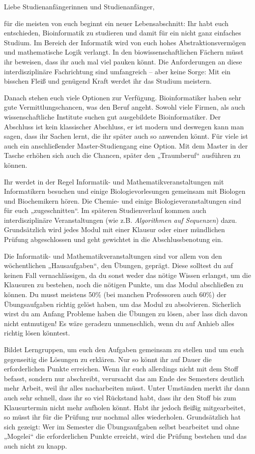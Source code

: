 Liebe Studienanfängerinnen und Studienanfänger,\par
für die meisten von euch beginnt ein neuer Lebensabschnitt:
Ihr habt euch entschieden, Bioinformatik zu studieren und damit für ein nicht ganz einfaches Studium.
Im Bereich der Informatik wird von euch hohes Abstraktionsvermögen und mathematische Logik verlangt.
In den biowissenschaftlichen Fächern müsst ihr beweisen, dass ihr auch mal viel pauken könnt.
Die Anforderungen an diese interdisziplinäre Fachrichtung sind umfangreich – aber keine Sorge:
Mit ein bisschen Fleiß und genügend Kraft werdet ihr das Studium meistern.

Danach stehen euch viele Optionen zur Verfügung.
Bioinformatiker haben sehr gute Vermittlungschancen, was den Beruf angeht.
Sowohl viele Firmen, als auch wissenschaftliche Institute suchen gut ausgebildete Bioinformatiker.
Der Abschluss ist kein klassischer Abschluss, er ist modern und deswegen kann man sagen, dass ihr Sachen lernt, die ihr später auch so anwenden könnt.
Für viele ist auch ein anschließender Master-Studiengang eine Option.
Mit dem Master in der Tasche erhöhen sich auch die Chancen, später den „Traumberuf“ ausführen zu können.

Ihr werdet in der Regel Informatik- und Mathematikveranstaltungen mit Informatikern besuchen und einige Biologievorlesungen gemeinsam mit Biologen und Biochemikern hören.
Die Chemie- und einige Biologieveranstaltungen sind für euch „zugeschnitten“.
Im späteren Studienverlauf kommen auch interdisziplinäre Veranstaltungen (wie z.B. \textit{Algorithmen auf Sequenzen}) dazu.
Grundsätzlich wird jedes Modul mit einer Klausur oder einer mündlichen Prüfung abgeschlossen und geht gewichtet in die Abschlussbenotung ein.

Die Informatik- und Mathematikveranstaltungen sind vor allem von den wöchent\-lichen „Hausaufgaben“, den Übungen, geprägt.
Diese solltest du auf keinen Fall vernachlässigen, da du sonst weder das nötige Wissen erlangst, um die Klausuren zu bestehen, noch die nötigen Punkte, um das Modul abschließen zu können.
Du musst meistens 50\% (bei manchen Professoren auch 60\%) der Übungsaufgaben richtig gelöst haben, um das Modul zu absolvieren.
Sicherlich wirst du am Anfang Probleme haben die Übungen zu lösen, aber lass dich davon nicht entmutigen!
Es wäre geradezu unmenschlich, wenn du auf Anhieb alles richtig lösen könntest.

Bildet Lerngruppen, um euch den Aufgaben gemeinsam zu stellen und um euch gegenseitig die Lösungen zu erklären.
Nur so könnt ihr auf Dauer die erforderlichen Punkte erreichen.
Wenn ihr euch allerdings nicht mit dem Stoff befasst, sondern nur abschreibt, verursacht das am Ende des Semesters deutlich mehr Arbeit, weil ihr alles nacharbeiten müsst.
Unter Umständen merkt ihr dann auch sehr schnell, dass ihr so viel Rückstand habt, dass ihr den Stoff bis zum Klausurtermin nicht mehr aufholen könnt. Habt ihr jedoch fleißig mitgearbeitet, so müsst ihr für die Prüfung nur nochmal alles wiederholen.
Grundsätzlich hat sich gezeigt:
Wer im Semester die Übungsaufgaben selbst bearbeitet und ohne „Mogelei“ die erforderlichen Punkte erreicht, wird die Prüfung bestehen und das auch nicht zu knapp.

